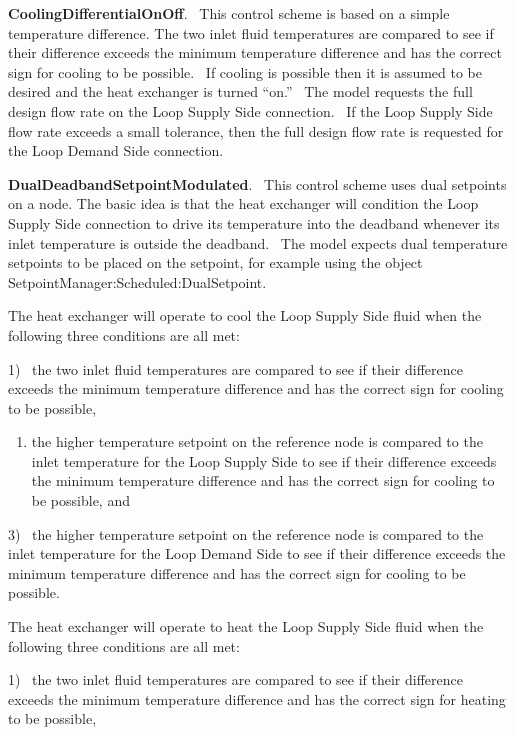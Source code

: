\textbf{CoolingDifferentialOnOff}.~ This control scheme is based on a simple temperature difference. The two inlet fluid temperatures are compared to see if their difference exceeds the minimum temperature difference and has the correct sign for cooling to be possible.~ If cooling is possible then it is assumed to be desired and the heat exchanger is turned ``on.''~ The model requests the full design flow rate on the Loop Supply Side connection.~ If the Loop Supply Side flow rate exceeds a small tolerance, then the full design flow rate is requested for the Loop Demand Side connection.

\textbf{DualDeadbandSetpointModulated}.~ This control scheme uses dual setpoints on a node. The basic idea is that the heat exchanger will condition the Loop Supply Side connection to drive its temperature into the deadband whenever its inlet temperature is outside the deadband.~ The model expects dual temperature setpoints to be placed on the setpoint, for example using the object SetpointManager:Scheduled:DualSetpoint.

The heat exchanger will operate to cool the Loop Supply Side fluid when the following three conditions are all met:

1)~ the two inlet fluid temperatures are compared to see if their difference exceeds the minimum temperature difference and has the correct sign for cooling to be possible,

\begin{enumerate}
\def\labelenumi{\arabic{enumi})}
\setcounter{enumi}{1}
\tightlist
\item
  the higher temperature setpoint on the reference node is compared to the inlet temperature for the Loop Supply Side to see if their difference exceeds the minimum temperature difference and has the correct sign for cooling to be possible, and
\end{enumerate}

3)~ the higher temperature setpoint on the reference node is compared to the inlet temperature for the Loop Demand Side to see if their difference exceeds the minimum temperature difference and has the correct sign for cooling to be possible.

The heat exchanger will operate to heat the Loop Supply Side fluid when the following three conditions are all met:

1)~ the two inlet fluid temperatures are compared to see if their difference exceeds the minimum temperature difference and has the correct sign for heating to be possible,

